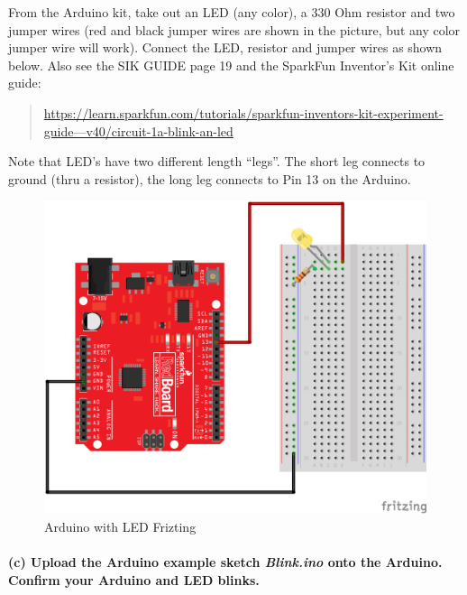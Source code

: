 \documentclass[11pt]{article}
\begin{document}
From the Arduino kit, take out an LED (any color), a 330 Ohm resistor
and two jumper wires (red and black jumper wires are shown in the
picture, but any color jumper wire will work). Connect the LED, resistor
and jumper wires as shown below. Also see the SIK GUIDE page 19 and the
SparkFun Inventor's Kit online guide:

\begin{quote}
\href{https://learn.sparkfun.com/tutorials/sparkfun-inventors-kit-experiment-guide---v40/circuit-1a-blink-an-led}{https://learn.sparkfun.com/tutorials/sparkfun-inventors-kit-experiment-guide---v40/circuit-1a-blink-an-led}
\end{quote}

Note that LED's have two different length ``legs''. The short leg
connects to ground (thru a resistor), the long leg connects to Pin 13 on
the Arduino.

\begin{figure}
\centering
\includegraphics{images/Arduino_LED_fritzing.png}
\caption{Arduino with LED Frizting}
\end{figure}

    \hypertarget{c-upload-the-arduino-example-sketch-blink.ino-onto-the-arduino.-confirm-your-arduino-and-led-blinks.}{%
\paragraph{\texorpdfstring{(c) Upload the Arduino example sketch
\textbf{\emph{Blink.ino}} onto the Arduino. Confirm your Arduino and LED
blinks.}{(c) Upload the Arduino example sketch Blink.ino onto the Arduino. Confirm your Arduino and LED blinks.}}\label{c-upload-the-arduino-example-sketch-blink.ino-onto-the-arduino.-confirm-your-arduino-and-led-blinks.}}
\end{document}

